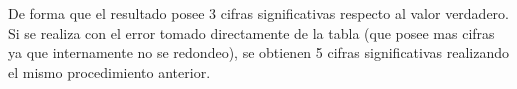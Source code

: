 \documentclass[12pt]{article}
\begin{document}
\begin{enumerate}[leftmargin=*,widest=9]
\begin{enumerate}[label=\alph*]
    De forma que el resultado posee 3 cifras significativas respecto al valor verdadero. Si se realiza con el error tomado directamente de la tabla (que posee mas cifras ya que internamente no se redondeo), se obtienen 5 cifras significativas realizando el mismo procedimiento anterior.
    
    \end{enumerate}

    
  \end{enumerate}
  
\end{document}
